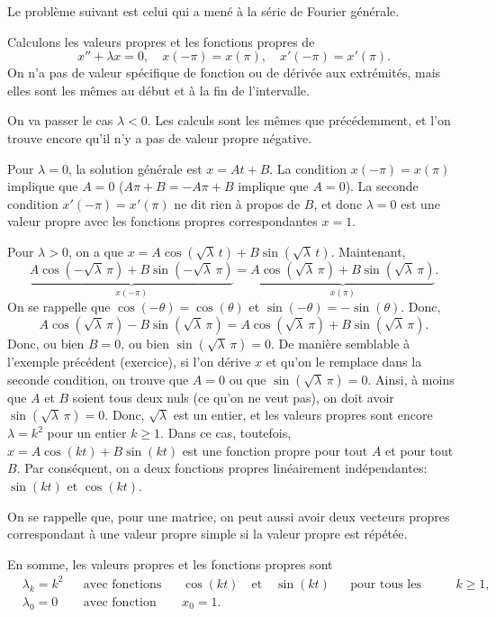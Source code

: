 Le problème suivant est celui qui a mené à la série de Fourier générale.

\begin{example} \label{bvp-periodic:example}
Calculons les valeurs propres et les fonctions propres de 
\begin{equation*}
x'' + \lambda x = 0, \quad x(-\pi) = x(\pi), \quad x'(-\pi) = x'(\pi) .
\end{equation*}
On n'a pas de valeur spécifique de fonction ou de dérivée aux extrémités, mais elles sont les mêmes au début et à la fin de l'intervalle. 

On va passer le cas $\lambda < 0$.  Les calculs sont les mêmes que précédemment, et l'on trouve encore qu'il n'y a pas de valeur propre négative. 

Pour $\lambda = 0$, la solution générale est $x = At + B$.  La condition
$x(-\pi) = x(\pi)$ implique que $A=0$ ($A\pi + B = -A\pi +B$ implique que $A=0$).
La seconde condition $x'(-\pi) = x'(\pi)$ ne dit rien à propos de $B$, et donc
$\lambda=0$ est une valeur propre avec les fonctions propres correspondantes $x=1$.

Pour $\lambda > 0$, on a que 
$x = A \cos ( \sqrt{\lambda}\, t ) + B \sin ( \sqrt{\lambda}\, t)$.
Maintenant,
\begin{equation*}
\underbrace{A \cos (-\sqrt{\lambda}\, \pi) + B \sin (-\sqrt{\lambda}\,
\pi)}_{x(-\pi)}
=
\underbrace{A \cos (  \sqrt{\lambda}\, \pi ) + B \sin ( \sqrt{\lambda}\,
\pi)}_{x(\pi)} .
\end{equation*}
On se rappelle que $\cos (- \theta) = \cos (\theta)$ et
$\sin (-\theta) = - \sin (\theta)$. Donc,
\begin{equation*}
A \cos (\sqrt{\lambda}\, \pi) - B \sin ( \sqrt{\lambda}\, \pi)
=
A \cos (\sqrt{\lambda}\, \pi) + B \sin ( \sqrt{\lambda}\, \pi).
\end{equation*}
Donc, ou bien $B=0$, ou bien $\sin ( \sqrt{\lambda}\, \pi) = 0$.
De manière semblable à l'exemple précédent (exercice), si l'on dérive $x$ et qu'on le remplace dans la seconde condition, on trouve que $A=0$ ou que $\sin ( \sqrt{\lambda}\, \pi) = 0$.
Ainsi, à moins que $A$ et $B$ soient tous deux nuls (ce qu'on ne veut pas), on doit avoir $\sin ( \sqrt{\lambda}\, \pi ) = 0$.  Donc, $\sqrt{\lambda}$
est un entier, et les valeurs propres sont encore $\lambda = k^2$ pour un entier
 $k \geq 1$. Dans ce cas, toutefois,  
$x = A \cos (k t) + B \sin (k t)$ est une fonction propre pour tout $A$ et pour tout $B$.
Par conséquent, on a deux fonctions propres linéairement indépendantes: $\sin (kt)$ et $\cos (kt)$.

On se rappelle que, pour une matrice, on peut aussi avoir deux vecteurs propres correspondant à une valeur propre simple si la valeur propre est répétée. 

En somme, les valeurs propres et les fonctions propres sont 
\begin{align*}
& \lambda_k = k^2 & & \text{avec fonctions propres} & &
\cos (k t) \quad \text{et}\quad  \sin (k t)
 & & \text{pour tous les entiers } k \geq 1 , \\
& \lambda_0 = 0 & & \text{avec fonction propre} & & x_0 = 1.
\end{align*}
\end{example}

